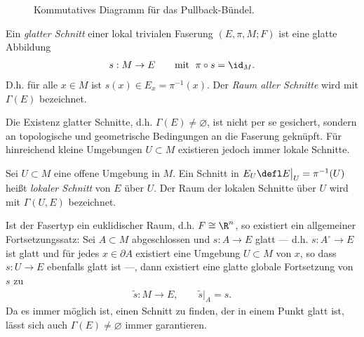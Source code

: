\documentclass[%
	paper=a5,%
	fleqn,%
	DIV=18,%
	BCOR=0mm,
	fontsize=11pt,
	titlepage=false,%
	bibliography=totoc,
	DIV=18,%
	twoside=true,
	pdftitle=Riemannsche Geometrie,
	pdfauthor=Uwe Semmelmann,
	numbers=noendperiod]%
	{scrbook}
\begin{document}
\begin{figure}[H]
\centering
{}
\caption{Kommutatives Diagramm für das Pullback-Bündel.}
\end{figure}


\begin{defn}
Ein \emph{glatter Schnitt} einer lokal trivialen Faserung $(E,\pi,M;F)$ ist eine
glatte Abbildung
\begin{align*}
s: M\to E    \qquad \text{mit }   \;  \pi\circ s = \id_M.
\end{align*}
D.h. für alle $x\in M$ ist $s(x)\in E_x = \pi^{-1}(x)$. Der \emph{Raum aller
Schnitte} wird mit $\Gamma(E)$ bezeichnet.
\fish
\end{defn}

Die Existenz glatter Schnitte, d.h. $\Gamma(E)\neq \varnothing$, ist nicht per
se gesichert, sondern an topologische und geometrische Bedingungen an die
Faserung geknüpft. Für hinreichend kleine Umgebungen $U\subset M$ existieren
jedoch immer lokale Schnitte.

\begin{defn}
Sei $U\subset M$ eine offene Umgebung in $M$. Ein Schnitt in $E_U \defl
E\big|_U= \pi^{-1}(U)$ heißt \emph{lokaler Schnitt} von
$E$ über $U$. Der Raum der lokalen Schnitte über $U$ wird mit $\Gamma(U,E)$
bezeichnet.\fish
\end{defn}

\begin{rem}
Ist der Fasertyp ein euklidischer Raum, d.h. $F\cong \R^n$, so existiert ein
allgemeiner Fortsetzungssatz: Sei $A\subset M$ abgeschlossen und $s\colon A\to E$
glatt --- d.h. $s\colon A^\circ \to E$ ist glatt und für jedes $x\in\partial A$
existiert eine Umgebung $U\subset M$ von $x$, so dass $s\colon U\to E$ ebenfalls
glatt ist ---, dann existiert eine glatte globale Fortsetzung von $s$ zu
\begin{align*}
\tilde{s}\colon M\to E,\qquad \tilde{s}\big|_A = s.
\end{align*}
Da es immer möglich ist, einen Schnitt zu finden, der in einem Punkt glatt ist, lässt
sich auch $\Gamma(E)\neq\varnothing$ immer garantieren.\map
\end{rem}
\end{document}
